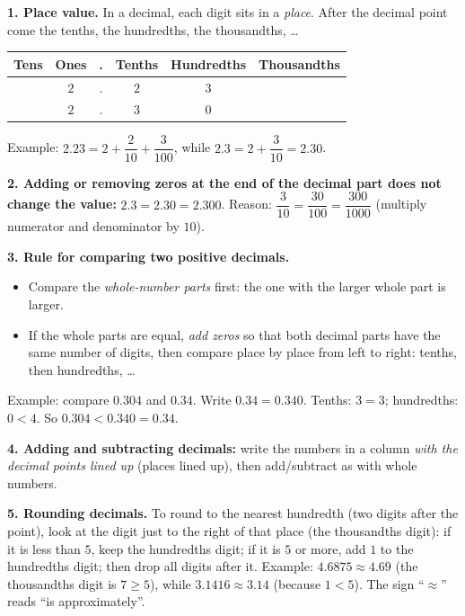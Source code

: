 \begin{knowbox}
\textbf{1. Place value.} In a decimal, each digit sits in a \emph{place}. After the decimal point come the tenths,
the hundredths, the thousandths, \ldots
\begin{center}
\renewcommand{\arraystretch}{1.25}
\begin{tabular}{|c|c|c|c|c|c|}
\hline
\rowcolor{tmBlue!10} Tens & Ones & . & Tenths & Hundredths & Thousandths\\ \hline
 & $2$ & . & $2$ & $3$ & \\ \hline
 & $2$ & . & $3$ & $0$ & \\ \hline
\end{tabular}
\end{center}
Example: $2.23 = 2 + \dfrac{2}{10} + \dfrac{3}{100}$, while $2.3 = 2 + \dfrac{3}{10} = 2.30$.

\textbf{2. Adding or removing zeros at the end of the decimal part does not change the value:}
$2.3 = 2.30 = 2.300$. Reason: $\dfrac{3}{10} = \dfrac{30}{100} = \dfrac{300}{1000}$ (multiply numerator and denominator by $10$).

\textbf{3. Rule for comparing two positive decimals.}
\begin{itemize}[leftmargin=1.4em,itemsep=1pt,topsep=2pt]
  \item Compare the \emph{whole-number parts} first: the one with the larger whole part is larger.
  \item If the whole parts are equal, \emph{add zeros} so that both decimal parts have the same number of digits,
  then compare place by place from left to right: tenths, then hundredths, \ldots
\end{itemize}
Example: compare $0.304$ and $0.34$. Write $0.34 = 0.340$. Tenths: $3 = 3$; hundredths: $0 < 4$.
So $0.304 < 0.340 = 0.34$.

\textbf{4. Adding and subtracting decimals:} write the numbers in a column \emph{with the decimal points lined up}
(places lined up), then add/subtract as with whole numbers.

\textbf{5. Rounding decimals.} To round to the nearest hundredth (two digits after the point), look at the digit just
to the right of that place (the thousandths digit): if it is less than $5$, keep the hundredths digit; if it is $5$ or more,
add $1$ to the hundredths digit; then drop all digits after it. Example: $4.6875 \approx 4.69$ (the thousandths digit is
$7 \ge 5$), while $3.1416 \approx 3.14$ (because $1 < 5$). The sign ``$\approx$'' reads ``is approximately''.
\end{knowbox}
